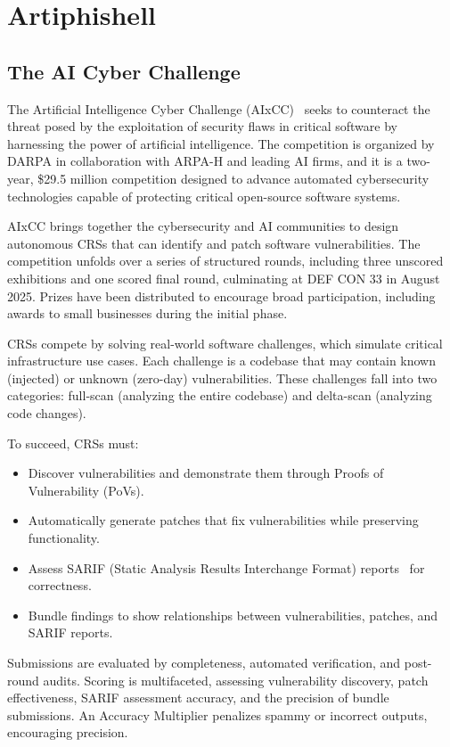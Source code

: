 \section{Artiphishell}
\label{sec:bg-artiphishell}

\subsection{The AI Cyber Challenge}
\label{sec:bg-aixcc}
The Artificial Intelligence Cyber Challenge (AIxCC)~\cite{aixcc} seeks to counteract the threat posed by the exploitation of security flaws in critical software by harnessing the power of artificial intelligence.
The competition is organized by DARPA in collaboration with ARPA-H and leading AI firms, and it is a two-year, \$29.5 million competition designed to advance automated cybersecurity technologies capable of protecting critical open-source software systems.

AIxCC brings together the cybersecurity and AI communities to design autonomous CRSs that can identify and patch software vulnerabilities.
The competition unfolds over a series of structured rounds, including three unscored exhibitions and one scored final round, culminating at DEF CON 33 in August 2025.
Prizes have been distributed to encourage broad participation, including awards to small businesses during the initial phase.

CRSs compete by solving real-world software challenges, which simulate critical infrastructure use cases.
Each challenge is a codebase that may contain known (injected) or unknown (zero-day) vulnerabilities.
These challenges fall into two categories: full-scan (analyzing the entire codebase) and delta-scan (analyzing code changes).

\newpage
\noindent
To succeed, CRSs must:
\begin{itemize}
    \item Discover vulnerabilities and demonstrate them through Proofs of Vulnerability (PoVs).
    \item Automatically generate patches that fix vulnerabilities while preserving functionality.
    \item Assess SARIF (Static Analysis Results Interchange Format) reports~\cite{sarif} for correctness.
    \item Bundle findings to show relationships between vulnerabilities, patches, and SARIF reports.
\end{itemize}

Submissions are evaluated by completeness, automated verification, and post-round audits.
Scoring is multifaceted, assessing vulnerability discovery, patch effectiveness, SARIF assessment accuracy, and the precision of bundle submissions.
An Accuracy Multiplier penalizes spammy or incorrect outputs, encouraging precision.

